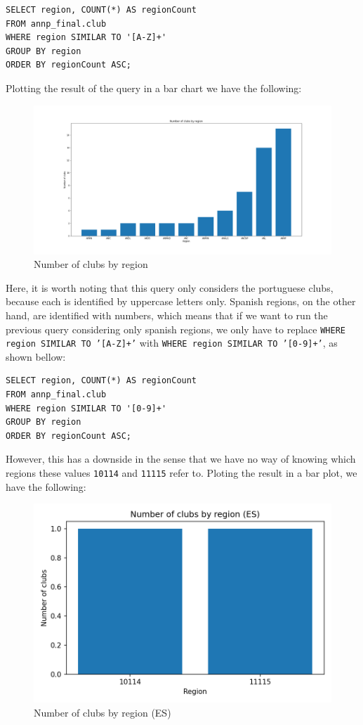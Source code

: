 \begin{verbatim}
SELECT region, COUNT(*) AS regionCount
FROM annp_final.club
WHERE region SIMILAR TO '[A-Z]+'
GROUP BY region
ORDER BY regionCount ASC;
\end{verbatim}

Plotting the result of the query in a bar chart we have the following:

\begin{figure}[H]
    \centering
    \includegraphics[width=.85\textwidth]{img/clubsbyregion}
    \caption{Number of clubs by region}
    \label{fig:clubs-by-region}
\end{figure}

Here, it is worth noting that this query only considers the portuguese clubs, because each is identified by uppercase
letters only.
Spanish regions, on the other hand, are identified with numbers, which means that if we want to run the previous query
considering only spanish regions, we only have to replace \texttt{WHERE region SIMILAR TO '[A-Z]+'} with
\texttt{WHERE region SIMILAR TO '[0-9]+'}, as shown bellow:

\begin{verbatim}
SELECT region, COUNT(*) AS regionCount
FROM annp_final.club
WHERE region SIMILAR TO '[0-9]+'
GROUP BY region
ORDER BY regionCount ASC;
\end{verbatim}

However, this has a downside in the sense that we have no way of knowing which regions these values \texttt{10114} and
\texttt{11115} refer to.
Ploting the result in a bar plot, we have the following:

\begin{figure}[H]
    \centering
    \includegraphics[width=.5\textwidth]{img/clubsbyregion-es}
    \caption{Number of clubs by region (ES)}
    \label{fig:clubs-by-region-es}
\end{figure}

